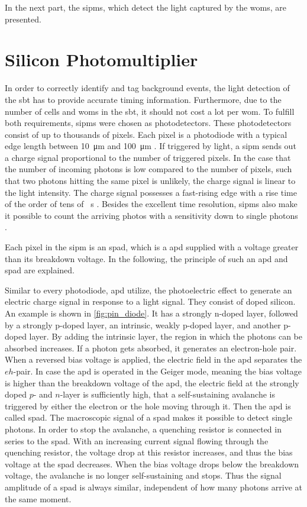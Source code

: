 In the next part, the \acp{sipm}, which detect the light captured by the \acp{wom}, are presented.


\section{Silicon Photomultiplier}
In order to correctly identify and tag background events, the light detection of the \ac{sbt} has to provide accurate timing information.
Furthermore, due to the number of cells and \acp{wom} in the \ac{sbt}, it should not cost a lot per \ac{wom}.
To fulfill both requirements, \acp{sipm} were chosen as photodetectors.
These photodetectors consist of up to thousands of pixels.
Each pixel is a photodiode with a typical edge length between \SI{10}{\micro\meter} and \SI{100}{\micro\meter} \cite{nucl}.
If triggered by light, a \ac{sipm} sends out a charge signal proportional to the number of triggered pixels.
In the case that the number of incoming photons is low compared to the number of pixels, such that two photons hitting the same pixel is unlikely, the charge signal is linear to the light intensity.
The charge signal possesses a fast-rising edge with a rise time of the order of tens of \si{\piko\second} \cite{nucl}.
Besides the excellent time resolution, \acp{sipm} also make it possible to count the arriving photos with a sensitivity down to single photons \cite{HAMA_mppc}.

Each pixel in the \ac{sipm} is an \ac{spad}, which is a \ac{apd} supplied with a voltage greater than its breakdown voltage.
In the following, the principle of such an \ac{apd} and \ac{spad} are explained.

Similar to every photodiode, \ac{apd} utilize, the photoelectric effect to generate an electric charge signal in response to a light signal.
They consist of doped silicon.
An example is shown in \autoref{fig:pin_diode}.
It has a strongly n-doped layer, followed by a strongly p-doped layer, an intrinsic, weakly p-doped layer, and another p-doped layer.
By adding the intrinsic layer, the region in which the photons can be absorbed increases.
If a photon gets absorbed, it generates an electron-hole pair.
When a reversed bias voltage is applied, the electric field in the \ac{apd} separates the $eh$-pair.
In case the \ac{apd} is operated in the Geiger mode, meaning the bias voltage is higher than the breakdown voltage of the \ac{apd}, the electric field at the strongly doped $p$- and $n$-layer is sufficiently high, that a self-sustaining avalanche is triggered by either the electron or the hole moving through it.
Then the \ac{apd} is called \ac{spad}.
The macroscopic signal of a \ac{spad} makes it possible to detect single photons.
In order to stop the avalanche, a quenching resistor is connected in series to the \ac{spad}.
With an increasing current signal flowing through the quenching resistor, the voltage drop at this resistor increases, and thus the bias voltage at the \ac{spad} decreases.
When the bias voltage drops below the breakdown voltage, the avalanche is no longer self-sustaining and stops.
Thus the signal amplitude of a \ac{spad} is always similar, independent of how many photons arrive at the same moment.


